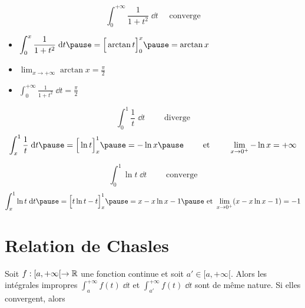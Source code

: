 \begin{frame}
\begin{exemple}
$$\int_0^{+\infty} \frac{1}{1+t^2}\;\dd t \quad \text{ converge}$$
\pause
\begin{itemize}
  \item $\displaystyle \int_0^{x} \frac{1}{1+t^2}\;\dd t 
  \pause=\Big[\arctan t\Big]_0^x
  \pause=\arctan x$
  \pause

  \item $\displaystyle \lim_{x\rightarrow+\infty}\arctan x 
    = \frac{\pi}{2}$
  \pause
  
  \item $\displaystyle \int_0^{+\infty} \frac{1}{1+t^2}\;\dd t = \frac{\pi}{2}$
\end{itemize}
\pause
{}
\end{exemple}
\end{frame}


\begin{frame}

\begin{exemple}
\pause
$$
\int_0^1 \frac{1}{t}\;\dd t\qquad \text{ diverge}
$$
\pause
$$
\int_x^1 \frac{1}{t}\;\dd t 
\pause
= \Big[\ln t\Big]_x^1 
\pause
= -\ln x
\pause
\qquad \text{ et } \qquad 
\lim_{x\rightarrow 0^+} -\ln x = +\infty
$$  
\end{exemple}
\pause
\bigskip

\begin{exemple}
$$
\int_0^1 \ln t\;\dd t\qquad \text{ converge}
$$ 
\pause
$$
\int_x^1 \ln t\;\dd t 
\pause
= \Big[t\ln t-t\Big]_x^1 
\pause
= x-x\ln x-1
\pause
 \text{ et } 
\lim_{x\rightarrow 0^+} (x-x\ln x-1) = -1
$$
\end{exemple}
\end{frame}


\section*{Relation de Chasles}

\begin{frame}
\begin{proposition} 
\pause
Soit $f : [a,+\infty[ \to \mathbb{R}$ une fonction continue et soit
  $a' \in [a,+\infty[$. 
  Alors les intégrales impropres $\int_a^{+\infty} f(t) \;\dd t$ 
  et $\int_{a'}^{+\infty} f(t) \;\dd t $ sont de même nature. 
  \pause
  Si elles convergent, alors 
\end{proposition}
\end{frame}



